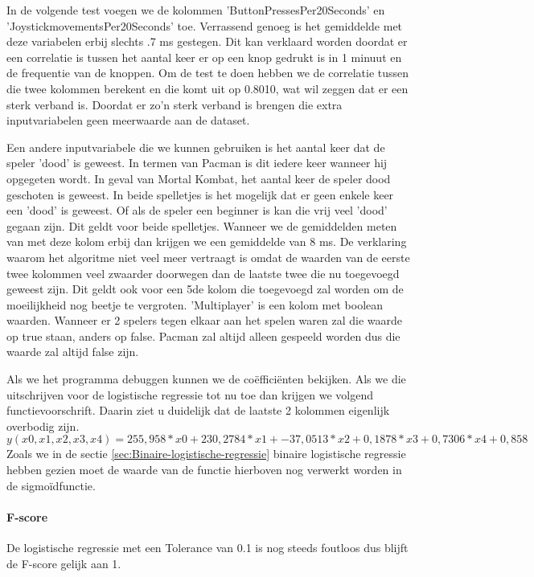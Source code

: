 In de volgende test voegen we de kolommen 'ButtonPressesPer20Seconds' en 'JoystickmovementsPer20Seconds' toe.  Verrassend genoeg is het gemiddelde met deze variabelen erbij slechts .7 ms gestegen. Dit kan verklaard worden doordat er een correlatie is tussen het aantal keer er op een knop gedrukt is in 1 minuut en de frequentie van de knoppen. Om de test te doen hebben we de correlatie tussen die twee kolommen berekent en die komt uit op 0.8010, wat wil zeggen dat er een sterk verband is. Doordat er zo'n sterk verband is brengen die extra inputvariabelen geen meerwaarde aan de dataset. 

Een andere inputvariabele die we kunnen gebruiken is het aantal keer dat de speler 'dood' is geweest. In termen van Pacman is dit iedere keer wanneer hij opgegeten wordt. In geval van Mortal Kombat, het aantal keer de speler dood geschoten is geweest. In beide spelletjes is het mogelijk dat er geen enkele keer een 'dood' is geweest. Of als de speler een beginner is kan die vrij veel 'dood' gegaan zijn. Dit geldt voor beide spelletjes.  Wanneer we de gemiddelden meten van met deze kolom erbij dan krijgen we een gemiddelde van 8 ms. De verklaring waarom het algoritme niet veel meer vertraagt is omdat de waarden van de eerste twee kolommen veel zwaarder doorwegen dan de laatste twee die nu toegevoegd geweest zijn. Dit geldt ook voor een 5de kolom die toegevoegd zal worden om de moeilijkheid nog beetje te vergroten.  'Multiplayer' is een kolom met boolean waarden. Wanneer er 2 spelers tegen elkaar aan het spelen waren zal die waarde op true staan, anders op false. Pacman zal altijd alleen gespeeld worden dus die waarde zal altijd false zijn.  

Als we het programma debuggen kunnen we de coëfficiënten bekijken. Als we die uitschrijven voor de logistische regressie tot nu toe dan krijgen we volgend functievoorschrift. Daarin ziet u duidelijk dat de laatste 2 kolommen eigenlijk overbodig zijn. 
$$
{y(x0, x1, x2, x3, x4) = 255,958*x0 + 230,2784*x1 + -37,0513*x2 + 0,1878*x3 + 0,7306*x4 + 0,858}
$$
Zoals we in de sectie \ref{sec:Binaire-logistische-regressie} binaire logistische regressie hebben gezien moet de waarde van de functie hierboven nog verwerkt worden in de sigmoïdfunctie. 
 

\paragraph{F-score} 

De logistische regressie met een Tolerance van 0.1 is nog steeds foutloos dus blijft de F-score gelijk aan 1.

